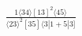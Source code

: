 \documentclass[varwidth, border=5pt]{standalone}
\begin{document}
\begin{my}
$\begin{gathered}
\scriptscriptstyle\frac{1⟨34⟩[13]^2⟨45⟩}{⟨23⟩^2[35]⟨3|1+5|3]}
\end{gathered}$
\end{my}
\end{document}
